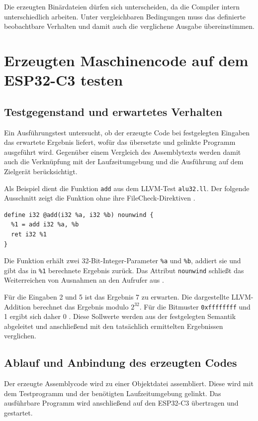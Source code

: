 \documentclass[11pt,a4paper]{article}
\newcommand{\code}[1]{\texttt{#1}}
\begin{document}
Die erzeugten Binärdateien dürfen sich unterscheiden, da die Compiler intern
unterschiedlich arbeiten. Unter vergleichbaren Bedingungen muss das definierte
beobachtbare Verhalten und damit auch die verglichene Ausgabe übereinstimmen.

\section{Erzeugten Maschinencode auf dem ESP32-C3 testen}\label{sec:ausfuehrung}

\subsection{Testgegenstand und erwartetes Verhalten}
Ein Ausführungstest untersucht, ob der erzeugte Code bei festgelegten
Eingaben das erwartete Ergebnis liefert, wofür das übersetzte
und gelinkte Programm ausgeführt wird. Gegenüber einem Vergleich des
Assemblytexts werden damit auch die Verknüpfung mit der Laufzeitumgebung
und die Ausführung auf dem Zielgerät berücksichtigt.

Als Beispiel dient die Funktion \code{add} aus dem LLVM-Test
\code{alu32.ll}. Der folgende Ausschnitt zeigt die Funktion ohne
ihre FileCheck-Direktiven \parencite{rvtest}.

\par\noindent\begin{minipage}{\linewidth}
\begin{lstlisting}[caption={IR-Funktion aus alu32.ll, FileCheck-Direktiven weggelassen}]
define i32 @add(i32 %a, i32 %b) nounwind {
  %1 = add i32 %a, %b
  ret i32 %1
}
\end{lstlisting}
\end{minipage}\par

Die Funktion erhält zwei 32-Bit-Integer-Parameter \code{\%a} und \code{\%b}, addiert sie und gibt das in \code{\%1} berechnete Ergebnis zurück. Das Attribut \code{nounwind} schließt das Weiterreichen von Ausnahmen an den Aufrufer aus \parencite{langref}.

Für die Eingaben 2 und 5 ist das Ergebnis 7 zu erwarten.
Die dargestellte LLVM-Addition berechnet das Ergebnis modulo
$2^{32}$. Für die Bitmuster \code{0xffffffff} und 1 ergibt sich
daher 0 \parencite[Abschnitt \emph{add Instruction}]{langref}.
Diese Sollwerte werden aus der festgelegten Semantik abgeleitet
und anschließend mit den tatsächlich ermittelten Ergebnissen
verglichen.

\subsection{Ablauf und Anbindung des erzeugten Codes}
Der erzeugte Assemblycode wird zu einer Objektdatei assembliert.
Diese wird mit dem Testprogramm und der benötigten Laufzeitumgebung
gelinkt. Das ausführbare Programm wird anschließend auf den
ESP32-C3 übertragen und gestartet.
\end{document}
